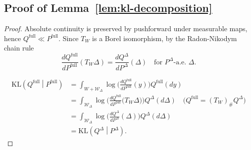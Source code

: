 \documentclass[10pt]{article} %
\newtheorem{lemma}{Lemma}
\begin{document}
\subsection{Proof of Lemma~\ref{lem:kl-decomposition}}


\begin{proof}
  Absolute continuity is preserved by pushforward under measurable maps, hence $Q^{\mathrm{full}}\ll P^{\mathrm{full}}$. Since $T_W$ is a Borel isomorphism, by the Radon-Nikodym chain rule
 \[
 \frac{dQ^{\mathrm{full}}}{dP^{\mathrm{full}}}(T_W\Delta)=\frac{dQ^{\Delta}}{dP^{\Delta}}(\Delta)\quad\text{for }P^{\Delta}\text{-a.e.\ }\Delta.
 \]

\begin{equation*}
     \begin{aligned}
 \mathrm{KL}\left(Q^{\mathrm{full}}\middle|P^{\mathrm{full}}\right)
 &= \int_{W+\mathcal W_\Delta}
 \log\Big(\frac{dQ^{\mathrm{full}}}{dP^{\mathrm{full}}}(y)\Big)
 Q^{\mathrm{full}}(dy)\\
 &= \int_{\mathcal W_\Delta}
 \log\Big(\frac{dQ^{\mathrm{full}}}{dP^{\mathrm{full}}}\big(T_W\Delta\big)\Big)
 Q^{\Delta}(d\Delta) \quad \text{(} Q^{\mathrm{full}}=(T_W)_{\text{\#}}Q^{\Delta}\text{)} 
 \\
 &= \int_{\mathcal W_\Delta}
 \log\Big(\frac{dQ^{\Delta}}{dP^{\Delta}}(\Delta)\Big)
 Q^{\Delta}(d\Delta) \\
 &= \mathrm{KL}\left(Q^{\Delta}\middle|P^{\Delta}\right).
 \end{aligned}
\end{equation*} 
\end{proof}
\end{document}
